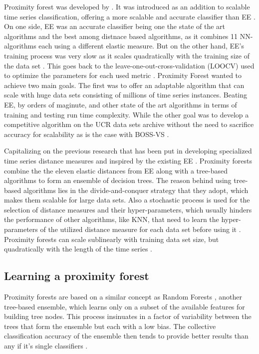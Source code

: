 Proximity forest was developed by \cite{lucas2019proximity}.
It was introduced as an addition to scalable time series classification, offering a more scalable and accurate classifier than EE \cite{tan2020fastee}.
On one side, EE was an accurate classifier being one the state of the art algorithms and the best among distnace based algorithms, as it combines 11 NN-algorithms each using a different elastic measure.
But on the other hand, EE's training process was very slow as it scales quadratically with the training size of the data set \cite{lines2015time,bagnall2017great}.
This goes back to the leave-one-out-cross-validation (LOOCV) used to optimize the parameters for each used metric \cite{shifaz2020ts}.\newline
Proximity Forest wanted to achieve two main goals. The first was to offer an adaptable algorithm that can scale with huge data sets consisting of millions of time series instances.
Beating EE, by orders of maginute, and other state of the art algorithms in terms of training and testing run time complexity.
While the other goal was to develop a competitive algorithm on the UCR data sets archive without the need to sacrifice accuracy for scalability as is the case with BOSS-VS \cite{lucas2019proximity}.\newline

Capitalizing on the previous research that has been put in developing specialized time series distance measures and inspired by the existing EE \cite{fawaz2020inceptiontime,fawaz2019deep}.
Proximity forests combine the the eleven elastic distances from EE along with a tree-based algorithms to form an ensemble of decision trees.
The reason behind using tree-based algorithms lies in the divide-and-conquer strategy that they adopt, which makes them scalable for large data sets.
Also a stochastic process is used for the selection of distance measures and their hyper-parameters, which usually hinders the performance of other algorithms,
like KNN, that need to learn the hyper-parameters of the utilized distance measure for each data set before using it \cite{lucas2019proximity}.
Proximity forests can scale sublinearly with training data set size, but quadratically with the length of the time series \cite{shifaz2020ts}.
\subsection{Learning a proximity forest}
Proximity forests are based on a similar concept as Random Forests \cite{breiman2001random}, another tree-based ensemble, which learns only on a subset of the available features
for building tree nodes. This process insinuates in a factor of variability between the trees that form the ensemble but each with a low bias.
The collective classification accuracy of the ensemble then tends to provide better results than any if it's single classifiers \cite{lucas2019proximity}.

